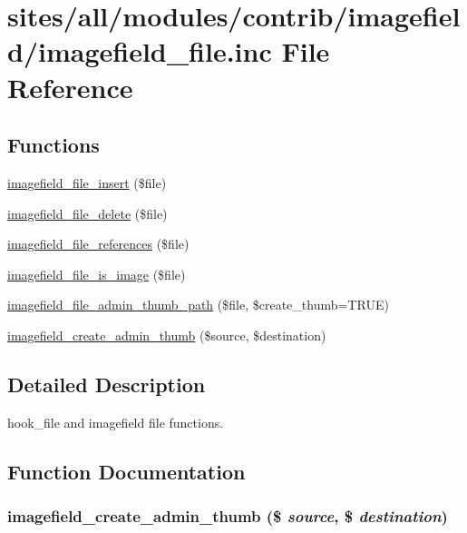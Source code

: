 \hypertarget{imagefield__file_8inc}{
\section{sites/all/modules/contrib/imagefield/imagefield\_\-file.inc File Reference}
\label{imagefield__file_8inc}
}
\subsection*{Functions}
\begin{CompactItemize}
\item 
\hyperlink{imagefield__file_8inc_9719de2adc80696507733e3390c10da4}{imagefield\_\-file\_\-insert} (\$file)
\item 
\hyperlink{imagefield__file_8inc_801b98dd8606a0deba530ce0a0f3cb12}{imagefield\_\-file\_\-delete} (\$file)
\item 
\hyperlink{imagefield__file_8inc_12ca7ad4f9d02d9338d517f494e8883c}{imagefield\_\-file\_\-references} (\$file)
\item 
\hyperlink{imagefield__file_8inc_4dc1eaffb4ea5cb05a516f47d858e84d}{imagefield\_\-file\_\-is\_\-image} (\$file)
\item 
\hyperlink{imagefield__file_8inc_bb6c32fd6df8c3186e903a79d09b5edc}{imagefield\_\-file\_\-admin\_\-thumb\_\-path} (\$file, \$create\_\-thumb=TRUE)
\item 
\hyperlink{imagefield__file_8inc_611c48837e1e76d6f6a0abbfe3e77a67}{imagefield\_\-create\_\-admin\_\-thumb} (\$source, \$destination)
\end{CompactItemize}


\subsection{Detailed Description}
hook\_\-file and imagefield file functions. 

\subsection{Function Documentation}
\hypertarget{imagefield__file_8inc_611c48837e1e76d6f6a0abbfe3e77a67}{
\subsubsection[{imagefield\_\-create\_\-admin\_\-thumb}]{\setlength{\rightskip}{0pt plus 5cm}imagefield\_\-create\_\-admin\_\-thumb (\$ {\em source}, \/  \$ {\em destination})}}
\label{imagefield__file_8inc_611c48837e1e76d6f6a0abbfe3e77a67}


